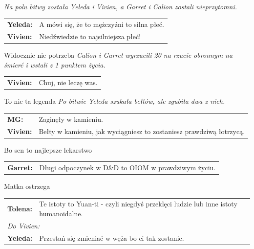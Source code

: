 \documentclass[10pt,twoside,twocolumn]{book}
\begin{document}
\begin{rpg-quotebox}{}
   \textit{Na polu bitwy została Yeleda i Vivien, a Garret i Calion zostali nieprzytomni.}\\

   \begin{tabularx}{\columnwidth}{lX}
      \textbf{Yeleda:} & A mówi się, że to mężczyźni to silna płeć.\\
      \textbf{Vivien:} & Niedźwiedzie to najsilniejsza płeć!\\
   \end{tabularx}
\end{rpg-quotebox}


\begin{rpg-quotebox}{Widocznie nie potrzeba}
   \textit{Calion i Garret wyrzucili 20 na rzucie obronnym na śmierć i wstali z 1 punktem życia.}\\

   \begin{tabularx}{\columnwidth}{lX}
      \textbf{Vivien:} & Chuj, nie leczę was.\\
   \end{tabularx}
\end{rpg-quotebox}


\begin{rpg-quotebox}{To nie ta legenda}
   \textit{Po bitwie Yeleda szukała bełtów, ale zgubiła dwa z nich.}\\

   \begin{tabularx}{\columnwidth}{lX}
      \textbf{MG:} & Zaginęły w kamieniu.\\
      \textbf{Vivien:} & Bełty w kamieniu, jak wyciągniesz to zostaniesz prawdziwą łotrzycą.\\
   \end{tabularx}
\end{rpg-quotebox}


\begin{rpg-quotebox}{Bo sen to najlepsze lekarstwo}
   \begin{tabularx}{\columnwidth}{lX}
      \textbf{Garret:} & Długi odpoczynek w D\&D to OIOM w prawdziwym życiu.\\
   \end{tabularx}
\end{rpg-quotebox}


\begin{rpg-quotebox}{Matka ostrzega}
   \begin{tabularx}{\columnwidth}{lX}
      \textbf{Tolena:} & Te istoty to Yuan-ti - czyli niegdyś przeklęci ludzie lub inne istoty humanoidalne.\\
      \multicolumn{2}{l}{\textit{Do Vivien:}}\\
      \textbf{Yeleda:} & Przestań się zmieniać w węża bo ci tak zostanie.\\
   \end{tabularx}
\end{rpg-quotebox}
\end{document}
